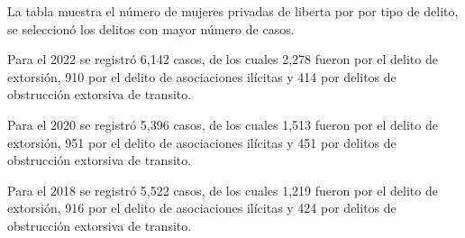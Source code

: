 La tabla muestra el número de mujeres privadas de liberta por por tipo de delito, se seleccionó los delitos con mayor número de casos. 

Para el 2022 se registró 6,142 casos, de los cuales 2,278 fueron por el delito de extorsión, 910 por el delito de asociaciones ilícitas y 414 por delitos de obstrucción extorsiva de transito.

Para el 2020 se registró 5,396 casos, de los cuales 1,513 fueron por el delito de extorsión, 951 por el delito de asociaciones ilícitas y 451 por delitos de obstrucción extorsiva de transito.

Para el 2018 se registró 5,522 casos, de los cuales 1,219 fueron por el delito de extorsión, 916 por el delito de asociaciones ilícitas y 424 por delitos de obstrucción extorsiva de transito.